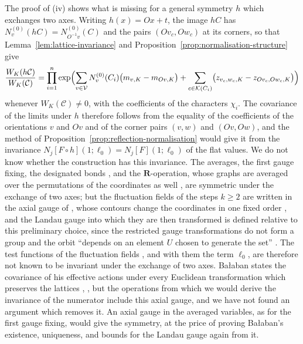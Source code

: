 \documentclass[11pt]{preprint}
\numberwithin{equation}{section}
\theoremstyle{definition}
\theoremstyle{remark}
\theoremstyle{plain}
\begin{document}
The proof of (iv) shows what is missing for a general symmetry $h$ which exchanges two axes. Writing $h(x) = Ox + t$, the image $hC$ has $N^{(0)}_v(hC) = N^{(0)}_{O^{-1}v}(C)$ and the pairs $(Ov_c, Ow_c)$ at its corners, so that Lemma~\ref{lem:lattice-invariance} and Proposition~\ref{prop:normalisation-structure} give
\begin{equation}\label{eq:permutation-defect}
    \frac{W_K(h\mathcal C)}{W_K(\mathcal C)} = \prod_{i=1}^{n}\exp\Bigl(\sum_{v \in \mathcal V}N^{(0)}_v(C_i)\bigl(m_{v,K} - m_{Ov,K}\bigr) + \sum_{c \in \mathcal K(C_i)}\bigl(z_{v_c,w_c,K} - z_{Ov_c,Ow_c,K}\bigr)\Bigr)
\end{equation}
whenever $W_K(\mathcal C) \neq 0$, with the coefficients of the characters $\chi_i$. The covariance of the limits under $h$ therefore follows from the equality of the coefficients of the orientations $v$ and $Ov$ and of the corner pairs $(v, w)$ and $(Ov, Ow)$, and the method of Proposition~\ref{prop:reflection-normalisation} would give it from the invariance $N_j[F \circ h](1; \ell_0) = N_j[F](1; \ell_0)$ of the flat values. We do not know whether the construction has this invariance. The averages, the first gauge fixing, the designated bonds \cite[p.~267, ll.~19--20]{BalabanRG1}, and the $\mathbf R$-operation, whose graphs are averaged over the permutations of the coordinates as well \cite[p.~201, ll.~34--38]{BalabanLFR1}, are symmetric under the exchange of two axes; but the fluctuation fields of the steps $k \geq 2$ are written in the axial gauge of \cite[(1.19), p.~79]{BalabanREG}, whose contours change the coordinates in one fixed order \cite[(1.7), p.~18]{BalabanPRT1}, and the Landau gauge into which they are then transformed is defined relative to this preliminary choice, since the restricted gauge transformations do not form a group and the orbit ``depends on an element $U$ chosen to generate the set'' \cite[pp.~80--81]{BalabanREG}. The test functions of the fluctuation fields \cite[(3.16), p.~268]{BalabanCRE}, and with them the term $\ell_0$, are therefore not known to be invariant under the exchange of two axes. Ba{\l}aban states the covariance of his effective actions under every Euclidean transformation which preserves the lattices \cite[p.~269, ll.~9--26]{BalabanRG1}, \cite[(3.39), p.~274]{BalabanCRE}, but the operations from which we would derive the invariance of the numerator include this axial gauge, and we have not found an argument which removes it. An axial gauge in the averaged variables, as for the first gauge fixing, would give the symmetry, at the price of proving Ba{\l}aban's existence, uniqueness, and bounds for the Landau gauge again from it.
\end{document}
